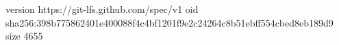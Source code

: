 version https://git-lfs.github.com/spec/v1
oid sha256:398b775862401e400088f4c4bf1201f9e2c24264c8b51ebff554cbed8eb189d9
size 4655
